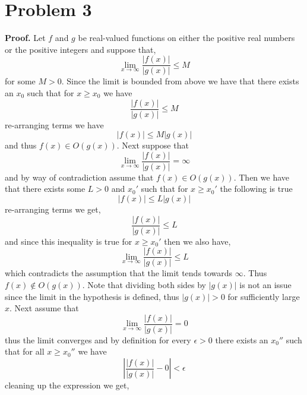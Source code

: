 \documentclass[12pt]{report}
\begin{document}
\section*{Problem 3}
\textbf{Proof.} Let $f$ and $g$ be real-valued functions on either the positive real numbers or the positive integers and suppose that,
\begin{equation*}
    \lim_{x \to \infty} \frac{|f(x)|}{|g(x)|} \leq M
\end{equation*}
for some $M > 0$. Since the limit is bounded from above we have that there exists an $x_0$ such that for $x \geq x_0$ we have
\begin{equation*}
   \frac{|f(x)|}{|g(x)|}  \leq M
\end{equation*}
re-arranging terms we have
\begin{equation*}
    |f(x)| \leq M |g(x)|
\end{equation*}
and thus $f(x) \in O(g(x))$. Next suppose that
\begin{equation*}
    \lim_{x \to \infty} \frac{|f(x)|}{|g(x)|} = \infty
\end{equation*}
and by way of contradiction assume that $f(x) \in O(g(x))$. Then we have that there exists some $L > 0$ and $x_0'$ such that for $x \geq x_0'$ the following is true
\begin{equation*}
    |f(x)| \leq L|g(x)|
\end{equation*}
re-arranging terms we get,
\begin{equation*}
    \frac{|f(x)|}{|g(x)|} \leq L
\end{equation*}
and since this inequality is true for $x \geq x_0'$ then we also have,
\begin{equation*}
    \lim_{x \to \infty} \frac{|f(x)|}{|g(x)|} \leq L
\end{equation*}
which contradicts the assumption that the limit tends towards $\infty$. Thus $f(x) \not\in O(g(x))$. Note that dividing both sides by $|g(x)|$ is not an issue since the limit in the hypothesis is defined, thus $|g(x)| > 0$ for sufficiently large $x$. Next assume that 
\begin{equation*}
    \lim_{x \to \infty} \frac{|f(x)|}{|g(x)|} = 0
\end{equation*}
thus the limit converges and by definition for every $\epsilon > 0$ there exists an $x_0''$ such that for all $x \geq x_0''$ we have
\begin{equation*}
    \left| \frac{|f(x)|}{|g(x)|} - 0\right| < \epsilon
\end{equation*}
cleaning up the expression we get,
\end{document}
